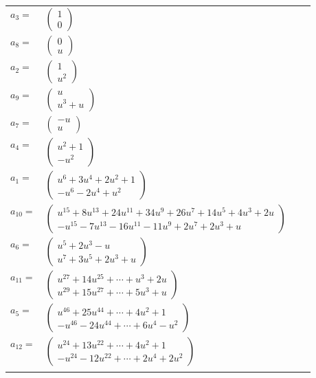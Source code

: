\documentclass[1p]{elsarticle_modified}
\theoremstyle{definition}
\begin{document}
\begin{tabular}{m{7pt} m{180pt} m{7pt} m{180pt} }
\flushright $a_{3}=$&$\begin{pmatrix}1\\0\end{pmatrix}$ \\
\flushright $a_{8}=$&$\begin{pmatrix}0\\u\end{pmatrix}$ \\
\flushright $a_{2}=$&$\begin{pmatrix}1\\u^2\end{pmatrix}$ \\
\flushright $a_{9}=$&$\begin{pmatrix}u\\u^3+u\end{pmatrix}$ \\
\flushright $a_{7}=$&$\begin{pmatrix}- u\\u\end{pmatrix}$ \\
\flushright $a_{4}=$&$\begin{pmatrix}u^2+1\\- u^2\end{pmatrix}$ \\
\flushright $a_{1}=$&$\begin{pmatrix}u^6+3 u^4+2 u^2+1\\- u^6-2 u^4+u^2\end{pmatrix}$ \\
\flushright $a_{10}=$&$\begin{pmatrix}u^{15}+8 u^{13}+24 u^{11}+34 u^9+26 u^7+14 u^5+4 u^3+2 u\\- u^{15}-7 u^{13}-16 u^{11}-11 u^9+2 u^7+2 u^3+u\end{pmatrix}$ \\
\flushright $a_{6}=$&$\begin{pmatrix}u^5+2 u^3- u\\u^7+3 u^5+2 u^3+u\end{pmatrix}$ \\
\flushright $a_{11}=$&$\begin{pmatrix}u^{27}+14 u^{25}+\cdots+u^3+2 u\\u^{29}+15 u^{27}+\cdots+5 u^3+u\end{pmatrix}$ \\
\flushright $a_{5}=$&$\begin{pmatrix}u^{46}+25 u^{44}+\cdots+4 u^2+1\\- u^{46}-24 u^{44}+\cdots+6 u^4- u^2\end{pmatrix}$ \\
\flushright $a_{12}=$&$\begin{pmatrix}u^{24}+13 u^{22}+\cdots+4 u^2+1\\- u^{24}-12 u^{22}+\cdots+2 u^4+2 u^2\end{pmatrix}$\\&\end{tabular}
\end{document}
